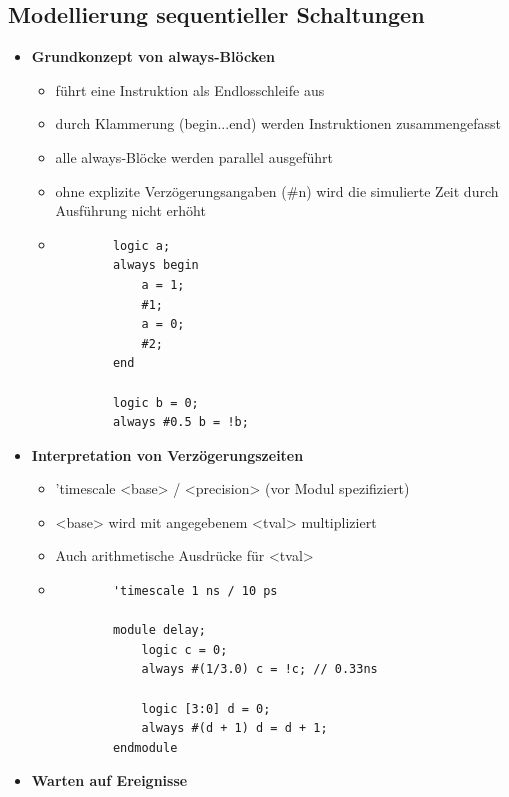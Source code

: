 \documentclass[11pt,a4paper]{article}
\begin{document}
\subsection{Modellierung sequentieller Schaltungen}
\begin{itemize}

\item \textbf{Grundkonzept von always-Blöcken}
	\begin{itemize}
	\item führt eine Instruktion als Endlosschleife aus
	\item durch Klammerung (begin...end) werden Instruktionen zusammengefasst
	\item alle always-Blöcke werden parallel ausgeführt
	\item ohne explizite Verzögerungsangaben (\#n) wird die simulierte Zeit durch Ausführung nicht erhöht
	\item[]
		\begin{lstlisting}
		logic a;
		always begin
			a = 1;
			#1;
			a = 0;
			#2;
		end
		
		logic b = 0;
		always #0.5 b = !b;
		\end{lstlisting}
	\end{itemize}
	
\pagebreak	
	
\item \textbf{Interpretation von Verzögerungszeiten}
	\begin{itemize}
	\item 'timescale <base> / <precision> 	(vor Modul spezifiziert)
	\item <base> wird mit angegebenem <tval> multipliziert
	\item Auch arithmetische Ausdrücke für <tval>
	\item[]
		\begin{lstlisting}
		'timescale 1 ns / 10 ps
		
		module delay;
			logic c = 0;
			always #(1/3.0) c = !c; // 0.33ns
			
			logic [3:0] d = 0;
			always #(d + 1) d = d + 1;
		endmodule				
		\end{lstlisting}
	
	
	\end{itemize}
	
\item \textbf{Warten auf Ereignisse}
	\begin{itemize}
		

\end{itemize}
\end{itemize}
\end{document}
